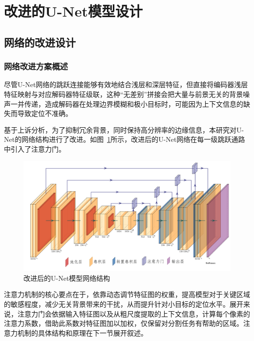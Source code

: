 \section{改进的U-Net模型设计}


\subsection{网络的改进设计}

\subsubsection{网络改进方案概述}

尽管U-Net网络的跳跃连接能够有效地结合浅层和深层特征，但直接将编码器浅层特征映射与对应解码器特征级联，这种“无差别”拼接会把大量与前景无关的背景噪声一并传递，造成解码器在处理边界模糊和极小目标时，可能因为上下文信息的缺失而导致定位不准确。

基于上诉分析，为了抑制冗余背景，同时保持高分辨率的边缘信息，本研究对U-Net的网络结构进行了改进。如图~\ref{fig:attunet_frame}所示，改进后的U-Net网络在每一级跳跃通路中引入了注意力门。

\begin{figure}[htbp]
    \centering
    \includegraphics[width=\textwidth]{fig/attunet_frame.png}
    \caption{改进后的U-Net模型网络结构}
    \label{fig:attunet_frame}
\end{figure}

注意力机制的核心要点在于，依靠动态调节特征图的权重，提高模型对于关键区域的敏感程度，减少无关背景带来的干扰，从而提升针对小目标的定位水平\cite{oktay2018}。展开来说，注意力门会依据输入特征图以及从粗尺度提取的上下文信息，计算每个像素的注意力系数，借助此系数对特征图加以加权，仅保留对分割任务有帮助的区域。注意力机制的具体结构和原理在下一节展开叙述。

